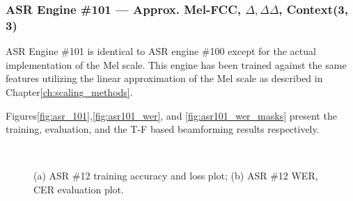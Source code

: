 \subsubsection{ASR Engine \#101 --- Approx. Mel-FCC, \(\Delta,\Delta\Delta\), Context(3, 3)}
ASR Engine \#101 is identical to ASR engine \#100 except for the
actual implementation of the Mel scale. This engine has been
trained against the same features 
utilizing 
the linear approximation of the Mel scale
as described in Chapter\;\ref{ch:scaling_methods}.

\bigskip

Figures\;\ref{fig:asr_101},\;\ref{fig:asr101_wer}, 
and \ref{fig:asr101_wer_masks}
present the training, evaluation, and the 
T-F based beamforming results respectively. 

\begin{figure}[H]
    \centering
    \\
    \vspace{-0.3cm}
    \caption{(a) ASR \#12 training accuracy and loss plot;\;\;
        (b) ASR \#12 WER, CER evaluation plot.}\label{fig:asr101_wer_subplot} 
\end{figure}

